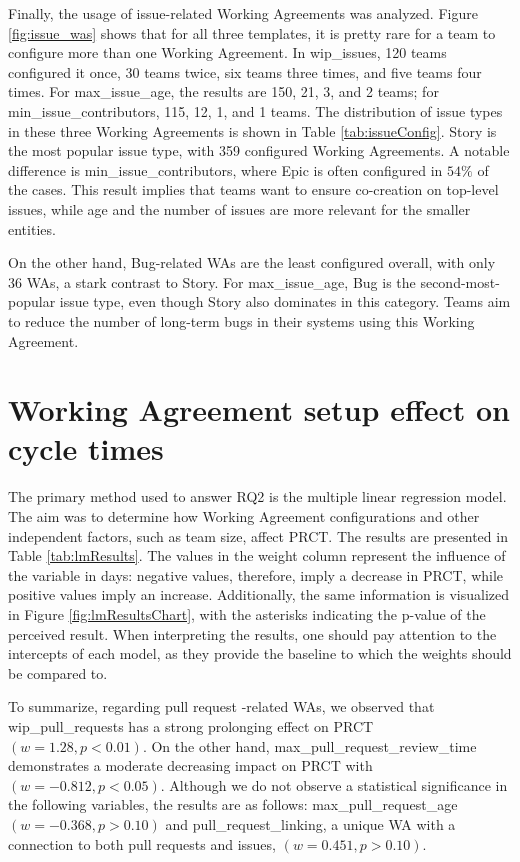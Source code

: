 Finally, the usage of issue-related Working Agreements was analyzed. Figure \ref{fig:issue_was} shows that for all three templates, it is pretty rare for a team to configure more than one Working Agreement. In wip\_issues, 120 teams configured it once, 30 teams twice, six teams three times, and five teams four times. For max\_issue\_age, the results are 150, 21, 3, and 2 teams; for min\_issue\_contributors, 115, 12, 1, and 1 teams.   
The distribution of issue types in these three Working Agreements is shown in Table \ref{tab:issueConfig}. Story is the most popular issue type, with 359 configured Working Agreements. A notable difference is min\_issue\_contributors, where Epic is often configured in $54\%$ of the cases. This result implies that teams want to ensure co-creation on top-level issues, while age and the number of issues are more relevant for the smaller entities. 



On the other hand, Bug-related WAs are the least configured overall, with only 36 WAs, a stark contrast to Story. For max\_issue\_age, Bug is the second-most-popular issue type, even though Story also dominates in this category. Teams aim to reduce the number of long-term bugs in their systems using this Working Agreement. 



\section{Working Agreement setup effect on cycle times}

The primary method used to answer RQ2 is the multiple linear regression model. The aim was to determine how Working Agreement configurations and other independent factors, such as team size, affect PRCT. The results are presented in Table \ref{tab:lmResults}. The values in the weight column represent the influence of the variable in days: negative values, therefore, imply a decrease in PRCT, while positive values imply an increase. Additionally, the same information is visualized in Figure \ref{fig:lmResultsChart}, with the asterisks indicating the p-value of the perceived result. When interpreting the results, one should pay attention to the intercepts of each model, as they provide the baseline to which the weights should be compared to. 

To summarize, regarding pull request -related WAs, we observed that wip\_pull\_requests has a strong prolonging effect on PRCT $(w=1.28,p<0.01)$. On the other hand, max\_pull\_request\_review\_time demonstrates a moderate decreasing impact on PRCT with $(w=-0.812,p<0.05)$. Although we do not observe a statistical significance in the following variables, the results are as follows: max\_pull\_request\_age $(w=-0.368,p>0.10)$ and pull\_request\_linking, a unique WA with a connection to both pull requests and issues, $(w=0.451,p>0.10)$.  

